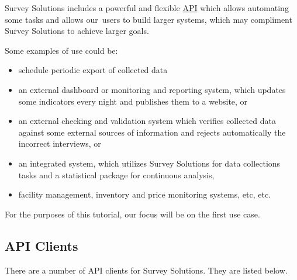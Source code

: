 \documentclass[
  letterpaper,
  DIV=11,
  numbers=noendperiod]{scrreprt}
\begin{document}
Survey Solutions includes a powerful and flexible
\href{https://docs.mysurvey.solutions/headquarters/api/survey-solutions-api/}{API}
which allows automating some tasks and allows our~users to build larger
systems, which may compliment Survey Solutions to achieve larger goals.~

Some examples of use could be:

\begin{itemize}
\item
  schedule periodic export of collected data
\item
  an external dashboard or monitoring and reporting system, which
  updates some indicators every night and publishes them to a website,
  or
\item
  an external checking and validation system which verifies collected
  data against some external sources of information and rejects
  automatically the incorrect interviews, or
\item
  an integrated system, which utilizes Survey Solutions for data
  collections tasks and a statistical package for continuous analysis,
\item
  facility management, inventory and price monitoring systems, etc, etc.
\end{itemize}

For the purposes of this tutorial, our focus will be on the first use
case.

\subsection{API Clients}\label{api-clients}

There are a number of API clients for Survey Solutions. They are listed
below.
\end{document}
